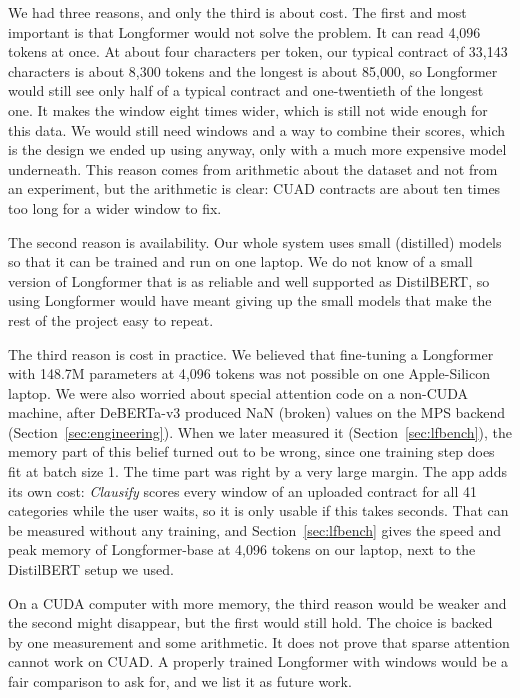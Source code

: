 We had three reasons, and only the third is about cost. The first and most important is that Longformer would not solve the problem. It can read 4{,}096 tokens at once. At about four characters per token, our typical contract of 33{,}143 characters is about 8{,}300 tokens and the longest is about 85{,}000, so Longformer would still see only half of a typical contract and one-twentieth of the longest one. It makes the window eight times wider, which is still not wide enough for this data. We would still need windows and a way to combine their scores, which is the design we ended up using anyway, only with a much more expensive model underneath. This reason comes from arithmetic about the dataset and not from an experiment, but the arithmetic is clear: CUAD contracts are about ten times too long for a wider window to fix.

The second reason is availability. Our whole system uses small (distilled) models so that it can be trained and run on one laptop. We do not know of a small version of Longformer that is as reliable and well supported as DistilBERT, so using Longformer would have meant giving up the small models that make the rest of the project easy to repeat.

The third reason is cost in practice. We believed that fine-tuning a Longformer with 148.7M parameters at 4{,}096 tokens was not possible on one Apple-Silicon laptop. We were also worried about special attention code on a non-CUDA machine, after DeBERTa-v3 produced NaN (broken) values on the MPS backend (Section~\ref{sec:engineering}). When we later measured it (Section~\ref{sec:lfbench}), the memory part of this belief turned out to be wrong, since one training step does fit at batch size 1. The time part was right by a very large margin. The app adds its own cost: \emph{Clausify} scores every window of an uploaded contract for all 41 categories while the user waits, so it is only usable if this takes seconds. That can be measured without any training, and Section~\ref{sec:lfbench} gives the speed and peak memory of Longformer-base at 4{,}096 tokens on our laptop, next to the DistilBERT setup we used.

On a CUDA computer with more memory, the third reason would be weaker and the second might disappear, but the first would still hold. The choice is backed by one measurement and some arithmetic. It does not prove that sparse attention cannot work on CUAD. A properly trained Longformer with windows would be a fair comparison to ask for, and we list it as future work.

